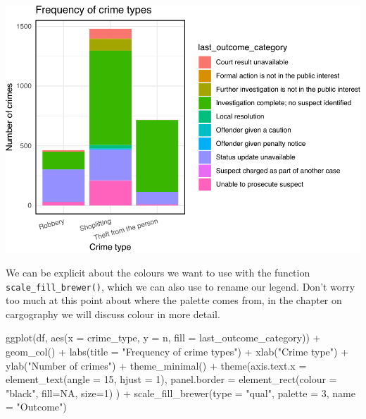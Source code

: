\documentclass[
]{book}
\newenvironment{Shaded}{\begin{snugshade}}{\end{snugshade}}
\newcommand{\AttributeTok}[1]{\textcolor[rgb]{0.77,0.63,0.00}{#1}}
\newcommand{\ConstantTok}[1]{\textcolor[rgb]{0.00,0.00,0.00}{#1}}
\newcommand{\DecValTok}[1]{\textcolor[rgb]{0.00,0.00,0.81}{#1}}
\newcommand{\FunctionTok}[1]{\textcolor[rgb]{0.00,0.00,0.00}{#1}}
\newcommand{\NormalTok}[1]{#1}
\newcommand{\SpecialCharTok}[1]{\textcolor[rgb]{0.00,0.00,0.00}{#1}}
\newcommand{\StringTok}[1]{\textcolor[rgb]{0.31,0.60,0.02}{#1}}
\begin{document}
\includegraphics{crime_mapping_files/figure-latex/unnamed-chunk-12-1.pdf}

We can be explicit about the colours we want to use with the function \texttt{scale\_fill\_brewer()}, which we can also use to rename our legend. Don't worry too much at this point about where the palette comes from, in the chapter on cargography we will discuss colour in more detail.

\begin{Shaded}
\begin{Highlighting}[]
\FunctionTok{ggplot}\NormalTok{(df, }\FunctionTok{aes}\NormalTok{(}\AttributeTok{x =}\NormalTok{ crime\_type, }\AttributeTok{y =}\NormalTok{ n, }\AttributeTok{fill =}\NormalTok{ last\_outcome\_category)) }\SpecialCharTok{+} 
  \FunctionTok{geom\_col}\NormalTok{() }\SpecialCharTok{+} 
  \FunctionTok{labs}\NormalTok{(}\AttributeTok{title =} \StringTok{"Frequency of crime types"}\NormalTok{) }\SpecialCharTok{+} 
  \FunctionTok{xlab}\NormalTok{(}\StringTok{"Crime type"}\NormalTok{) }\SpecialCharTok{+} 
  \FunctionTok{ylab}\NormalTok{(}\StringTok{"Number of crimes"}\NormalTok{) }\SpecialCharTok{+} 
  \FunctionTok{theme\_minimal}\NormalTok{() }\SpecialCharTok{+} 
  \FunctionTok{theme}\NormalTok{(}\AttributeTok{axis.text.x =} \FunctionTok{element\_text}\NormalTok{(}\AttributeTok{angle =} \DecValTok{15}\NormalTok{, }
                                   \AttributeTok{hjust =} \DecValTok{1}\NormalTok{), }
        \AttributeTok{panel.border =} \FunctionTok{element\_rect}\NormalTok{(}\AttributeTok{colour =} \StringTok{"black"}\NormalTok{, }
                                    \AttributeTok{fill=}\ConstantTok{NA}\NormalTok{, }
                                    \AttributeTok{size=}\DecValTok{1}\NormalTok{)}
\NormalTok{        ) }\SpecialCharTok{+} 
  \FunctionTok{scale\_fill\_brewer}\NormalTok{(}\AttributeTok{type =} \StringTok{"qual"}\NormalTok{, }\AttributeTok{palette =} \DecValTok{3}\NormalTok{, }\AttributeTok{name =} \StringTok{"Outcome"}\NormalTok{)}
\end{Highlighting}
\end{Shaded}
\end{document}
